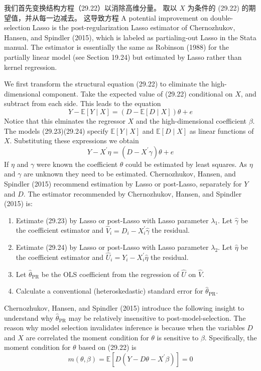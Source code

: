 {我们首先变换结构方程（29.22）以消除高维分量。 取以 $X$ 为条件的 (29.22) 的期望值，并从每一边减去。 这导致方程 
A potential improvement on double-selection Lasso is the post-regularization Lasso estimator of Chernozhukov, Hansen, and Spindler (2015), which is labeled as partialing-out Lasso in the Stata manual. The estimator is essentially the same as Robinson (1988) for the partially linear model (see Section 19.24) but estimated by Lasso rather than kernel regression.

We first transform the structural equation (29.22) to eliminate the high-dimensional component. Take the expected value of (29.22) conditional on $X$, and subtract from each side. This leads to the equation
$$
Y-\mathbb{E}[Y \mid X]=(D-\mathbb{E}[D \mid X]) \theta+e
$$
Notice that this elminates the regressor $X$ and the high-dimensional coefficient $\beta$. The models (29.23)(29.24) specify $\mathbb{E}[Y \mid X]$ and $\mathbb{E}[D \mid X]$ as linear functions of $X$. Substituting these expressions we obtain
$$
Y-X^{\prime} \eta=\left(D-X^{\prime} \gamma\right) \theta+e
$$
If $\eta$ and $\gamma$ were known the coefficient $\theta$ could be estimated by least squares. As $\eta$ and $\gamma$ are unknown they need to be estimated. Chernozhukov, Hansen, and Spindler (2015) recommend estimation by Lasso or post-Lasso, separately for $Y$ and $D$.
The estimator recommended by Chernozhukov, Hansen, and Spindler (2015) is:

\begin{enumerate}
\item  Estimate (29.23) by Lasso or post-Lasso with Lasso parameter $\lambda_{1}$. Let $\widehat{\gamma}$ be the coefficient estimator and $\widehat{V}_{i}=D_{i}-X_{i}^{\prime} \widehat{\gamma}$ the residual.
\item  Estimate (29.24) by Lasso or post-Lasso with Lasso parameter $\lambda_{2}$. Let $\widehat{\eta}$ be the coefficient estimator and $\hat{U}_{i}=Y_{i}-X_{i}^{\prime} \hat{\eta}$ the residual.
\item  Let $\widehat{\theta}_{\mathrm{PR}}$ be the OLS coefficient from the regression of $\widehat{U}$ on $\widehat{V}$.
\item  Calculate a conventional (heteroskedastic) standard error for $\widehat{\theta}_{\mathrm{PR}}$.
\end{enumerate}

Chernozhukov, Hansen, and Spindler (2015) introduce the following insight to understand why $\widehat{\theta}_{\mathrm{PR}}$ may be relatively insensitive to post-model-selection. The reason why model selection invalidates inference is because when the variables $D$ and $X$ are correlated the moment condition for $\theta$ is sensitive to $\beta$. Specifically, the moment condition for $\theta$ based on (29.22) is
$$
m(\theta, \beta)=\mathbb{E}\left[D\left(Y-D \theta-X^{\prime} \beta\right)\right]=0
$$

}
